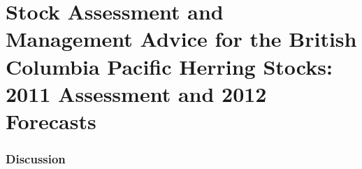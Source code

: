 

\part{Stock Assessment and Management Advice for the British Columbia Pacific Herring Stocks: 2011 Assessment and 2012 Forecasts}

\addtocounter{chapter}{1}







\section{Discussion}